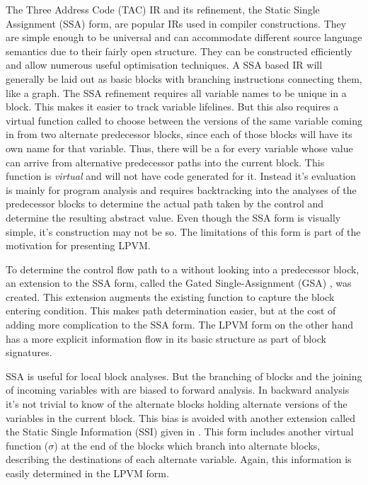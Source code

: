 The Three Address Code (TAC) IR and its refinement, the Static Single
Assignment (SSA) form, are popular IRs used in compiler constructions. They are
simple enough to be universal and can accommodate different source language
semantics due to their fairly open structure. They can be constructed
efficiently \citep{cytronSSA} and allow numerous useful optimisation
techniques. A SSA based IR will generally be laid out as basic blocks with
branching instructions connecting them, like a graph. The SSA refinement
requires all variable names to be unique in a block. This makes it easier to
track variable lifelines. But this also requires a virtual function called
\phif to choose between the versions of the same variable coming in from two
alternate predecessor blocks, since each of those blocks will have its own name
for that variable. Thus, there will be a \phif for every variable whose value
can arrive from alternative predecessor paths into the current block. This
function is \textit{virtual} and will not have code generated for it. Instead
it's evaluation is mainly for program analysis and requires backtracking into
the analyses of the predecessor blocks to determine the actual path taken by
the control and determine the resulting abstract value. Even though the SSA
form is visually simple, it's construction may not be so. The limitations of
this form is part of the motivation for presenting LPVM.

To determine the control flow path to a \phif without looking into a
predecessor block, an extension to the SSA form, called the Gated
Single-Assignment (GSA) \citep{gsa}, was created. This extension augments the existing
\phif function to capture the block entering condition. This makes path
determination easier, but at the cost of adding more complication to the SSA
form. The LPVM form on the other hand has a more explicit information flow in
its basic structure as part of block signatures.

SSA is useful for local block analyses. But the branching of blocks and the
joining of incoming variables with \phifs are biased to forward analysis. In
backward analysis it's not trivial to know of the alternate blocks holding
alternate versions of the variables in the current block. This bias is avoided
with another extension called the Static Single Information (SSI) given in
\cite{ssi}. This form includes another virtual function ($\sigma$) at the end
of the blocks which branch into alternate blocks, describing the destinations
of each alternate variable. Again, this information is easily determined in the
LPVM form.

